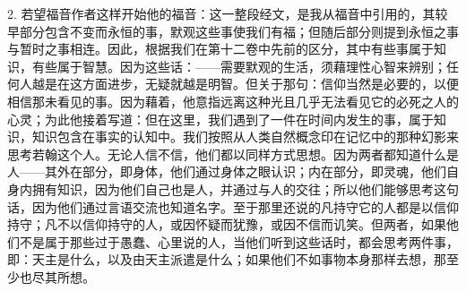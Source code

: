 2. 若望福音作者这样开始他的福音：这一整段经文，是我从福音中引用的，其较早部分包含不变而永恒的事，默观这些事使我们有福；但随后部分则提到永恒之事与暂时之事相连。因此，根据我们在第十二卷中先前的区分，其中有些事属于知识，有些属于智慧。因为这些话：——需要默观的生活，须藉理性心智来辨别；任何人越是在这方面进步，无疑就越是明智。但关于那句：信仰当然是必要的，以便相信那未看见的事。因为藉着，他意指远离这种光且几乎无法看见它的必死之人的心灵；为此他接着写道：但在这里，我们遇到了一件在时间内发生的事，属于知识，知识包含在事实的认知中。我们按照从人类自然概念印在记忆中的那种幻影来思考若翰这个人。无论人信不信，他们都以同样方式思想。因为两者都知道什么是人——其外在部分，即身体，他们通过身体之眼认识；内在部分，即灵魂，他们自身内拥有知识，因为他们自己也是人，并通过与人的交往；所以他们能够思考这句话，因为他们通过言语交流也知道名字。至于那里还说的凡持守它的人都是以信仰持守；凡不以信仰持守的人，或因怀疑而犹豫，或因不信而讥笑。但两者，如果他们不是属于那些过于愚蠢、心里说的人，当他们听到这些话时，都会思考两件事，即：天主是什么，以及由天主派遣是什么；如果他们不如事物本身那样去想，那至少也尽其所想。\par

